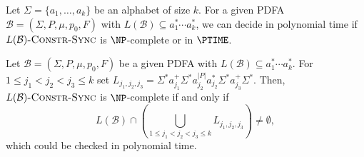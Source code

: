  
\begin{theoremrep}
 Let $\Sigma = \{a_1, \ldots, a_k\}$
 be an alphabet of size $k$.
 For a given PDFA $\mathcal B = (\Sigma, P, \mu, p_0, F)$
 with $L(\mathcal B)\subseteq a_1^* \cdots a_k^*$,
 we can decide in polynomial time
 if $L(\mathcal B)\textsc{-Constr-Sync}$
 is $\NP$-complete or in $\PTIME$.
\end{theoremrep}
\begin{proofsketch}
 Let $\mathcal B = (\Sigma, P, \mu, p_0, F)$
 be a given PDFA with $L(\mathcal B) \subseteq a_1^* \cdots a_k^*$.
 For $1 \le j_1 < j_2 < j_3 \le k$
 set
 $
  L_{j_1, j_2, j_3} = \Sigma^* a_{j_1}^+ \Sigma^* a_{j_2}^{|P|}a_{j_2}^* \Sigma^* a_{j_3}^+ \Sigma^*.
 $
 Then, $L(\mathcal B)\textsc{-Constr-Sync}$
 is $\NP$-complete if and only if
 \[
  L(\mathcal B) \cap \left( \bigcup_{1 \le j_1 < j_2  < j_3 \le k} L_{j_1, j_2, j_3}\right)
  \ne \emptyset,
 \]
 which could be checked in polynomial time.
\end{proofsketch}
